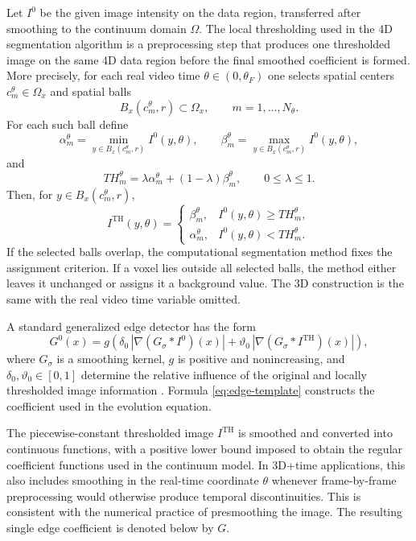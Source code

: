 \documentclass[11pt]{article}
\theoremstyle{remark}
\newcommand{\abs}[1]{\left\lvert #1\right\rvert}
\begin{document}
Let $I^0$ be the given image intensity on the data region, transferred after smoothing to the continuum domain $\Omega$.  The local thresholding used in the 4D segmentation algorithm is a preprocessing step that produces one thresholded image on the same 4D data region before the final smoothed coefficient is formed.  More precisely, for each real video time $\theta\in(0,\theta_F)$ one selects spatial centers $c_m^\theta\in\Omega_x$ and spatial balls
\[
        B_x(c_m^\theta,r)\subset\Omega_x,\qquad m=1,\dots,N_\theta.
\]
For each such ball define
\[
        \alpha_m^\theta=\min_{y\in B_x(c_m^\theta,r)} I^0(y,\theta),\qquad
        \beta_m^\theta=\max_{y\in B_x(c_m^\theta,r)} I^0(y,\theta),
\]
and
\[
        TH_m^\theta=\lambda\alpha_m^\theta+(1-\lambda)\beta_m^\theta,
        \qquad 0\le \lambda\le1.
\]
Then, for $y\in B_x(c_m^\theta,r)$,
\[
        I^{\mathrm{TH}}(y,\theta)=
        \begin{cases}
        \beta_m^\theta, & I^0(y,\theta)\ge TH_m^\theta,\\
        \alpha_m^\theta, & I^0(y,\theta)< TH_m^\theta.
        \end{cases}
\]
If the selected balls overlap, the computational segmentation method fixes the assignment criterion. If a voxel lies outside all selected balls, the method either leaves it unchanged or assigns it a background value. The 3D construction is the same with the real video time variable omitted.

A standard generalized edge detector has the form
\begin{equation}\label{eq:edge-template}
        G^0(x)=g\!\left(\delta_0\,\abs{\nabla(G_\sigma*I^0)(x)}+
        \vartheta_0\,\abs{\nabla(G_\sigma*I^{\mathrm{TH}})(x)}\right),
\end{equation}
where $G_\sigma$ is a smoothing kernel, $g$ is positive and nonincreasing, and $\delta_0,\vartheta_0\in[0,1]$ determine the relative influence of the original and locally thresholded image information \cite{umknskp2020,UbaMikulaPark2023}.  Formula \eqref{eq:edge-template} constructs the coefficient used in the evolution equation.

The piecewise-constant thresholded image $I^{\mathrm{TH}}$ is smoothed and converted into continuous functions, with a positive lower bound imposed to obtain the regular coefficient functions used in the continuum model.
  In 3D+time applications, this also includes smoothing in the real-time coordinate $\theta$ whenever frame-by-frame preprocessing would otherwise produce temporal discontinuities.
  This is consistent with the numerical practice of presmoothing the image. The resulting single edge coefficient is denoted below by $G$.
\end{document}

